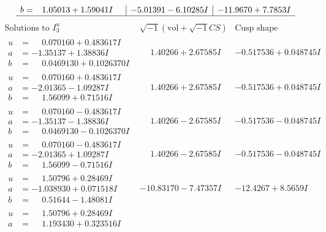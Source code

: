 \documentclass[1p]{elsarticle_modified}
\theoremstyle{definition}
\newcommand{\I}{\sqrt{-1}}
\begin{document}
$$\begin{array}{c|c|c}
\begin{aligned}
b &= \phantom{-}1.05013 + 1.59041 I\end{aligned}
 & -5.01391 - 6.10285 I & -11.9670 + 7.7853 I\\
 \hline 
 \end{array}$$\newpage$$\begin{array}{c|c|c}  
\text{Solutions to }I^u_{3}& \I (\text{vol} + \sqrt{-1}CS) & \text{Cusp shape}\\
 \hline 
\begin{aligned}
u &= \phantom{-}0.070160 + 0.483617 I \\
a &= -1.35137 + 1.38836 I \\
b &= \phantom{-}0.0469130 + 0.1026370 I\end{aligned}
 & \phantom{-}1.40266 + 2.67585 I & -0.517536 + 0.048745 I \\ \hline\begin{aligned}
u &= \phantom{-}0.070160 + 0.483617 I \\
a &= -2.01365 - 1.09287 I \\
b &= \phantom{-}1.56099 + 0.71516 I\end{aligned}
 & \phantom{-}1.40266 + 2.67585 I & -0.517536 + 0.048745 I \\ \hline\begin{aligned}
u &= \phantom{-}0.070160 - 0.483617 I \\
a &= -1.35137 - 1.38836 I \\
b &= \phantom{-}0.0469130 - 0.1026370 I\end{aligned}
 & \phantom{-}1.40266 - 2.67585 I & -0.517536 - 0.048745 I \\ \hline\begin{aligned}
u &= \phantom{-}0.070160 - 0.483617 I \\
a &= -2.01365 + 1.09287 I \\
b &= \phantom{-}1.56099 - 0.71516 I\end{aligned}
 & \phantom{-}1.40266 - 2.67585 I & -0.517536 - 0.048745 I \\ \hline\begin{aligned}
u &= \phantom{-}1.50796 + 0.28469 I \\
a &= -1.038930 + 0.071518 I \\
b &= \phantom{-}0.51644 - 1.48081 I\end{aligned}
 & -10.83170 - 7.47357 I & -12.4267 + 8.5659 I \\ \hline\begin{aligned}
u &= \phantom{-}1.50796 + 0.28469 I \\
a &= \phantom{-}1.193430 + 0.323516 I \\

\end{aligned}
\end{array}$$
\end{document}
